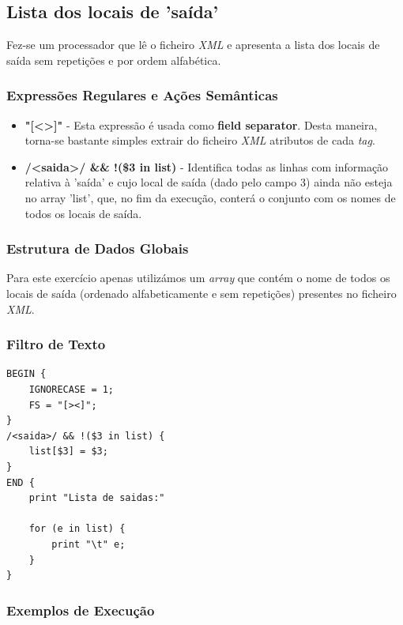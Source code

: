 \documentclass{article}
\begin{document}
\subsection{Lista dos locais de 'saída'}

Fez-se um processador que lê o ficheiro \emph{XML} e apresenta a lista dos locais de saída sem repetições e por ordem alfabética.

\subsubsection{Expressões Regulares e Ações Semânticas}

\begin{itemize}
    \item \textbf{"[\textless\textgreater]"} - Esta expressão é usada como \textbf{field separator}. Desta maneira, torna-se bastante simples extrair do ficheiro \emph{XML} atributos de cada \emph{tag}.
    \item \textbf{/\textless saida\textgreater/ && !(\$3 in list)} - Identifica todas as linhas com informação relativa à 'saída' e cujo local de saída (dado pelo campo 3) ainda não esteja no array 'list', que, no fim da execução, conterá o conjunto com os nomes de todos os locais de saída.
\end{itemize}

\subsubsection{Estrutura de Dados Globais}

Para este exercício apenas utilizámos um \emph{array} que contém o nome de todos os locais de saída (ordenado alfabeticamente e sem repetições) presentes no ficheiro \emph{XML}.

\subsubsection{Filtro de Texto}

\begin{lstlisting}
BEGIN {
	IGNORECASE = 1;
	FS = "[><]";
}
/<saida>/ && !($3 in list) {
	list[$3] = $3;
}
END {
	print "Lista de saidas:" 

	for (e in list) {
		print "\t" e;
	}
}
\end{lstlisting}

\subsubsection{Exemplos de Execução}
\end{document}
